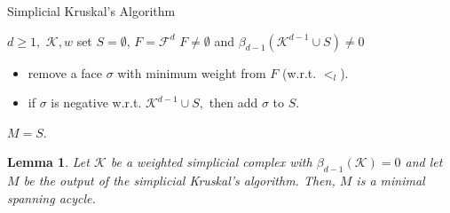 \documentclass[12pt]{amsart}
\newcommand{\dy}[1]{\textcolor{magenta}{#1}}
\newcommand{\remove}[1]{}
\renewcommand{\dy}[1]{#1}
\newtheorem{lemma}[theorem]{Lemma}
\numberwithin{equation}{section}
\numberwithin{theorem}{section}
\newcommand{\1}{\mathbf{1}}
\def\F{\mathcal{F}}
\def\K{\mathcal{K}}
\begin{document}
\begin{algorithm}[ht!]
\caption{Simplicial Kruskal's Algorithm}
\label{alg:Kruskal}
\begin{algorithmic}
 $d \geq 1,$ $\K, w$
\STATE set $S = \emptyset$, $F = \F^d$
 $F \neq \emptyset$ and $\beta_{d-1}(\K^{d-1} \cup S) \neq 0$
\begin{itemize}
\item remove a face $\sigma$ with minimum weight from $F$ (w.r.t. $<_l$).
\item if $\sigma$ is negative w.r.t. $\K^{d - 1} \cup S,$ then add $\sigma$ to $S$.
\end{itemize}
 $M = S$.
\end{algorithmic}
\end{algorithm}
%
\begin{lemma}
\label{lem:SimplicialKruskalOutcome}
Let $\K$ be a weighted simplicial complex with $\beta_{d-1}(\K) = 0$  and let $M$ be the output of the simplicial Kruskal's algorithm. Then, $M$ is a minimal spanning acycle.
\end{lemma}
%
%
\remove{In the case when weights of $\F^d$ are distinct, the Kruskal's algorithm generates the unique minimal spanning acycle but in other cases, it will generate a minimal spanning acycle depending on the tie-break rule used (see Remark \ref{rem:uniqueness}).}
%
\end{document}
